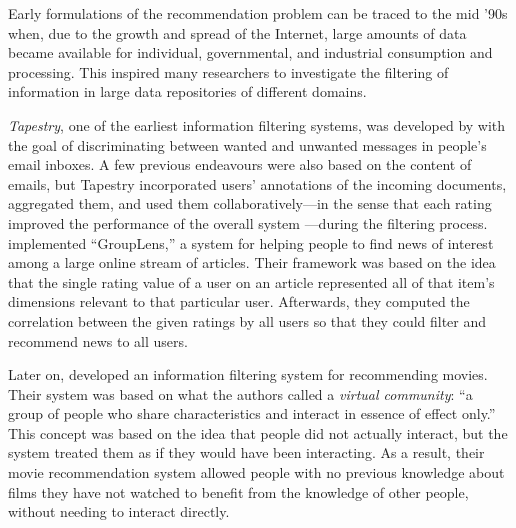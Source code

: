 Early formulations of the recommendation problem can be traced to the mid '90s when, due to the growth and spread of the Internet, large amounts of data became available for individual, governmental, and industrial consumption and processing.
This inspired many researchers to investigate the filtering of information in large data repositories of different domains.

\emph{Tapestry}, one of the earliest information filtering systems, was developed by \textcite{goldberg92using} with the goal of discriminating between wanted and unwanted messages in people's email inboxes. A few previous endeavours \autocite{pollock88rule, lutz90mafia} were also based on the content of emails, but Tapestry incorporated users' annotations of the incoming documents, aggregated them, and used them collabora\-tively---in the sense that each rating improved the performance of the overall system \autocite{goldberg01eigentaste}---during the filtering process. 
\textcite{resnick94grouplens} implemented ``GroupLens,'' a system for helping people to find news of interest among a large online stream of articles. Their framework was based on the idea that the single rating value of a user on an article represented all of that item's dimensions relevant to that particular user. Afterwards, they computed the correlation between the given ratings by all users so that they could filter and recommend news to all users.

Later on, \textcite{hill95recommending} developed an information filtering system for recommending movies. Their system was based on what the authors called a \emph{virtual community}: ``a group of people who share characteristics and interact in essence of effect only.'' 
This concept was based on the idea that people did not actually interact, but the system treated them as if they would have been interacting.
As a result, their movie recommendation system allowed people with no previous knowledge about films they have not watched to benefit from the knowledge of other people, without needing to interact directly.


